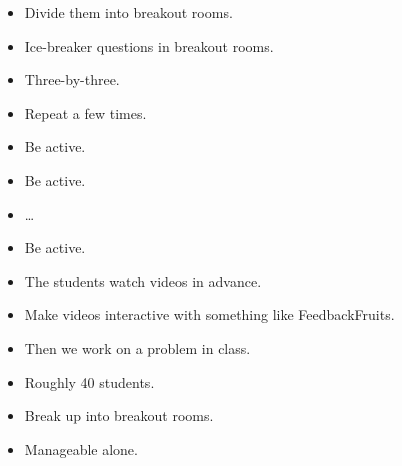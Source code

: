 \begin{frame}
  \begin{solution}[Size]
    \begin{itemize}
      \item Divide them into breakout rooms.
    \end{itemize}
  \end{solution}
\end{frame}

\begin{frame}
  \begin{solution}
    \begin{itemize}
      \item Ice-breaker questions in breakout rooms.
      \item Three-by-three.
      \item Repeat a few times.
    \end{itemize}
  \end{solution}

  \pause

  \begin{solution}
    \begin{itemize}
      \item Be active.
      \item Be active.
      \item \dots
      \item Be active.
    \end{itemize}
  \end{solution}
\end{frame}

\begin{frame}
  \begin{solution}
    \begin{itemize}
      \item The students watch videos in advance.
      \item Make videos interactive with something like FeedbackFruits.
      \item Then we work on a problem in class.
    \end{itemize}
  \end{solution}

  \begin{example}
    \begin{itemize}
      \item Roughly 40 students.
      \item Break up into breakout rooms.
      \item Manageable alone.
    \end{itemize}
  \end{example}
\end{frame}

